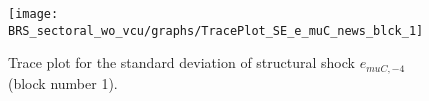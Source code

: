 \begin{figure}[H]
\centering
  \texttt{[image: BRS\_sectoral\_wo\_vcu/graphs/TracePlot\_SE\_e\_muC\_news\_blck\_1]}\\
    \caption{Trace plot for the standard deviation of structural shock ${e_{muC,-4}}$ (block number 1).}
\end{figure}
